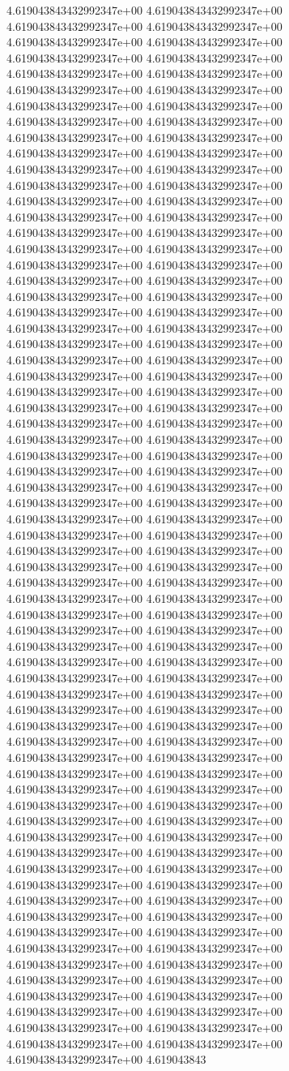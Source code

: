 4.619043843432992347e+00	4.619043843432992347e+00	4.619043843432992347e+00	4.619043843432992347e+00	4.619043843432992347e+00	4.619043843432992347e+00	4.619043843432992347e+00	4.619043843432992347e+00	4.619043843432992347e+00	4.619043843432992347e+00	4.619043843432992347e+00	4.619043843432992347e+00	4.619043843432992347e+00	4.619043843432992347e+00	4.619043843432992347e+00	4.619043843432992347e+00	4.619043843432992347e+00	4.619043843432992347e+00	4.619043843432992347e+00	4.619043843432992347e+00	4.619043843432992347e+00	4.619043843432992347e+00	4.619043843432992347e+00	4.619043843432992347e+00	4.619043843432992347e+00	4.619043843432992347e+00	4.619043843432992347e+00	4.619043843432992347e+00	4.619043843432992347e+00	4.619043843432992347e+00	4.619043843432992347e+00	4.619043843432992347e+00	4.619043843432992347e+00	4.619043843432992347e+00	4.619043843432992347e+00	4.619043843432992347e+00	4.619043843432992347e+00	4.619043843432992347e+00	4.619043843432992347e+00	4.619043843432992347e+00	4.619043843432992347e+00	4.619043843432992347e+00	4.619043843432992347e+00	4.619043843432992347e+00	4.619043843432992347e+00	4.619043843432992347e+00	4.619043843432992347e+00	4.619043843432992347e+00	4.619043843432992347e+00	4.619043843432992347e+00	4.619043843432992347e+00	4.619043843432992347e+00	4.619043843432992347e+00	4.619043843432992347e+00	4.619043843432992347e+00	4.619043843432992347e+00	4.619043843432992347e+00	4.619043843432992347e+00	4.619043843432992347e+00	4.619043843432992347e+00	4.619043843432992347e+00	4.619043843432992347e+00	4.619043843432992347e+00	4.619043843432992347e+00	4.619043843432992347e+00	4.619043843432992347e+00	4.619043843432992347e+00	4.619043843432992347e+00	4.619043843432992347e+00	4.619043843432992347e+00	4.619043843432992347e+00	4.619043843432992347e+00	4.619043843432992347e+00	4.619043843432992347e+00	4.619043843432992347e+00	4.619043843432992347e+00	4.619043843432992347e+00	4.619043843432992347e+00	4.619043843432992347e+00	4.619043843432992347e+00	4.619043843432992347e+00	4.619043843432992347e+00	4.619043843432992347e+00	4.619043843432992347e+00	4.619043843432992347e+00	4.619043843432992347e+00	4.619043843432992347e+00	4.619043843432992347e+00	4.619043843432992347e+00	4.619043843432992347e+00	4.619043843432992347e+00	4.619043843432992347e+00	4.619043843432992347e+00	4.619043843432992347e+00	4.619043843432992347e+00	4.619043843432992347e+00	4.619043843432992347e+00	4.619043843432992347e+00	4.619043843432992347e+00	4.619043843432992347e+00	4.619043843432992347e+00	4.619043843432992347e+00	4.619043843432992347e+00	4.619043843432992347e+00	4.619043843432992347e+00	4.619043843432992347e+00	4.619043843432992347e+00	4.619043843432992347e+00	4.619043843432992347e+00	4.619043843432992347e+00	4.619043843432992347e+00	4.619043843432992347e+00	4.619043843432992347e+00	4.619043843432992347e+00	4.619043843432992347e+00	4.619043843432992347e+00	4.619043843432992347e+00	4.619043843432992347e+00	4.619043843432992347e+00	4.619043843432992347e+00	4.619043843432992347e+00	4.619043843432992347e+00	4.619043843432992347e+00	4.619043843432992347e+00	4.619043843432992347e+00	4.619043843432992347e+00	4.619043843432992347e+00	4.619043843432992347e+00	4.619043843432992347e+00	4.619043843432992347e+00	4.619043843432992347e+00	4.619043843432992347e+00	4.619043843432992347e+00	4.619043843